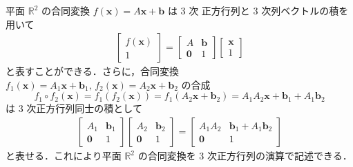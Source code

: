 \documentclass[11pt, uplatex, dvipdfmx, titlepage]{jsarticle}
\theoremstyle{definition}
\begin{document}
平面 $\mathbb{R}^2$ の合同変換 $f(\bm{x}) = A\bm{x} + \bm{b}$ は $3$ 次
正方行列と $3$ 次列ベクトルの積を用いて
\begin{align*}
  \left[
  \begin{array}{c}
    f(\bm{x})\\
    1
  \end{array}
  \right] = \left[
  \begin{array}{cc}
    A & \bm{b}\\
    \bm{0} & 1
  \end{array}
             \right] \left[
             \begin{array}{c}
               \bm{x}\\
               1
             \end{array}
  \right]
\end{align*}
と表すことができる．さらに，合同変換
$f_1(\bm{x})=A_1 \bm{x} + \bm{b}_1, \, f_2(\bm{x}) = A_2\bm{x} +
\bm{b}_2$ の合成
\[
  f_1\circ f_2(\bm{x}) =  f_1\left( f_2\left( \bm{x}\right) \right) 
  = f_1\left( A_2 \bm{x}+\bm{b}_2\right) = A_1 A_2 \bm{x} + \bm{b}_1+A_1\bm{b}_2
\]
は $3$ 次正方行列同士の積として
\begin{align*}
  \left[
  \begin{array}{cc}
    A_1 & \bm{b}_1\\
    \bm{0} & 1
  \end{array}
             \right] \left[
             \begin{array}{cc}
               A_2 & \bm{b}_2\\
               \bm{0} & 1
             \end{array}
                        \right] = \left[
                        \begin{array}{cc}
                          A_1 A_2 & \bm{b}_1+A_1\bm{b}_2\\
                          \bm{0} & 1
                        \end{array}
                                   \right]
\end{align*}
と表せる．これにより平面 $\mathbb{R}^2$ の合同変換を $3$ 次正方行列の演算で記述できる．
\end{document}
